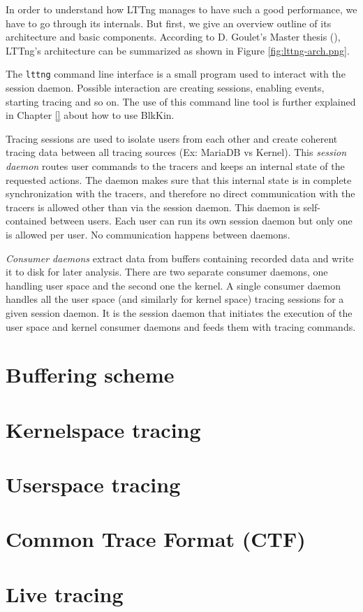 In order to understand how LTTng manages to have such a good performance, we
have to go through its internals. But first, we give an overview outline of its
architecture and basic components. According to D. Goulet's Master thesis
(\cite{goulet}), LTTng's architecture can be summarized as shown in Figure
\ref{fig:lttng-arch.png}.  


The \texttt{lttng} command line interface is a small program used to interact
with the session daemon. Possible interaction are creating sessions, enabling
events, starting tracing and so on. The use of this command line tool is further
explained in Chapter \ref{} about how to use BlkKin.

Tracing sessions are used to isolate users from each other and create coherent
tracing data between all tracing sources (Ex: MariaDB vs Kernel). This
\textit{session daemon} routes user commands to the tracers and keeps an
internal state of the requested actions. The daemon makes sure that this
internal state is in complete synchronization with the tracers, and therefore no
direct communication with the tracers is allowed other than via the session
daemon.  This daemon is self-contained between users. Each user can run its own
session daemon but only one is allowed per user. No communication happens
between daemons. 

\textit{Consumer daemons} extract data from buffers containing recorded data and
write it to disk for later analysis. There are two separate consumer daemons,
one handling user space and the second one the kernel. A single consumer daemon
handles all the user space (and similarly for kernel space) tracing sessions for
a given session daemon. It is the session daemon that initiates the execution of
the user space and kernel consumer daemons and feeds them with tracing commands.

\section{Buffering scheme}\label{sec:buffers}

\section{Kernelspace tracing}\label{sec:kernel-tracing}

\section{Userspace tracing}\label{sec:user-tracing}

\section{Common Trace Format (CTF)}\label{sec:ctf}

\section{Live tracing}\label{sec:relayd}
